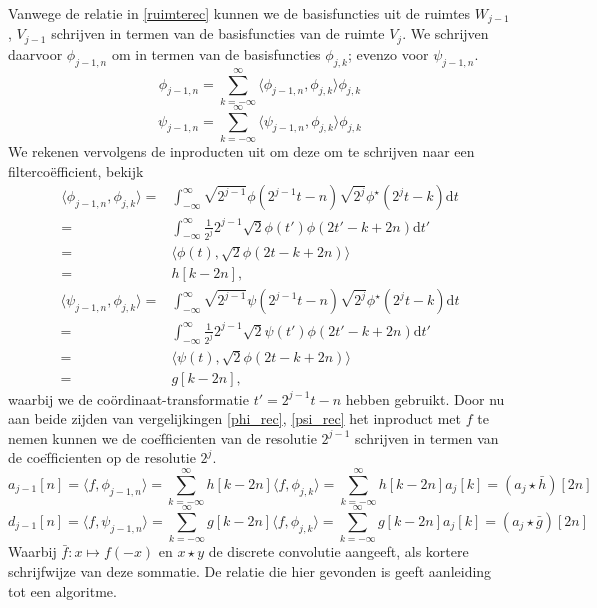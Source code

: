 \documentclass[11pt]{uvamath}
\theoremstyle{plain}
\theoremstyle{definition}
\theoremstyle{remark}
\newcommand{\eq}[1]{\begin{eqnarray*} #1 \end{eqnarray*}}
\newcommand{\inpr}[2]{\langle #1 , #2 \rangle}
\renewcommand{\d}[1]{{\mathrm{d} #1}}
\begin{document}
Vanwege de relatie in \ref{ruimterec} kunnen we de basisfuncties uit de ruimtes $W_{j-1}$,
$V_{j-1}$ schrijven in termen van de basisfuncties van de ruimte $V_j$.
We schrijven daarvoor $\phi_{j-1,n}$ om in termen van de basisfuncties $\phi_{j,k}$; evenzo
voor $\psi_{j-1,n}$.
\begin{equation}
  \label{phi_rec}
  \phi_{j-1,n} = \sum_{k=-\infty}^{\infty} \inpr{\phi_{j-1,n}}{\phi_{j,k}} \phi_{j,k}
\end{equation}
\begin{equation}
  \label{psi_rec}
  \psi_{j-1,n} = \sum_{k=-\infty}^{\infty} \inpr{\psi_{j-1,n}}{\phi_{j,k}} \phi_{j,k}
\end{equation}
We rekenen vervolgens de inproducten uit om deze om te schrijven naar een filterco\"efficient,
bekijk
\eq{
  \inpr{\phi_{j-1,n}}{\phi_{j,k}}
  =& \int_{-\infty}^\infty \sqrt{2^{j-1}}\phi(2^{j-1}t -n)
  \sqrt{2^{j}}\phi^\star(2^j t - k) \d{t}\\
  =& \int_{-\infty}^\infty \tfrac{1}{2^j} 2^{j-1}
  \sqrt{2} \phi(t') \phi(2t' - k + 2n) \d{t'}\\
  =& \inpr{\phi(t)}{\sqrt{2}\phi(2t-k+2n)} \\
  =& h[k-2n],
}
\eq{
  \inpr{\psi_{j-1,n}}{\phi_{j,k}}
  =& \int_{-\infty}^\infty \sqrt{2^{j-1}}\psi(2^{j-1}t -n)
  \sqrt{2^{j}}\phi^\star(2^j t - k) \d{t}\\
  =& \int_{-\infty}^\infty \tfrac{1}{2^j} 2^{j-1}
  \sqrt{2} \psi(t') \phi(2t' - k + 2n) \d{t'}\\
  =& \inpr{\psi(t)}{\sqrt{2}\phi(2t-k+2n)} \\
  =& g[k-2n],
}
waarbij we de co\"ordinaat-transformatie $t' = 2^{j-1}t - n$ hebben gebruikt.
Door nu aan beide zijden van vergelijkingen \ref{phi_rec}, \ref{psi_rec} het
inproduct met $f$ te nemen kunnen we de coe\"fficienten van de resolutie $2^{j-1}$ schrijven
in termen van de coe\"fficienten op de resolutie $2^j$.
\begin{equation}
  \label{approx_rec}
  a_{j-1}[n] = \inpr{f}{\phi_{j-1,n}}
  = \sum_{k=-\infty}^{\infty} h[k-2n] \inpr{f}{\phi_{j,k}}
  = \sum_{k=-\infty}^\infty h[k-2n] a_{j}[k]
  = (a_j \star \bar h)[2n]
\end{equation}
\begin{equation}
  \label{detail_rec}
  d_{j-1}[n] = \inpr{f}{\psi_{j-1,n}}
  = \sum_{k=-\infty}^{\infty} g[k-2n] \inpr{f}{\phi_{j,k}}
  = \sum_{k=-\infty}^\infty g[k-2n] a_{j}[k]
  = (a_j \star \bar g)[2n]
\end{equation}
Waarbij $\bar f: x \mapsto f(-x)$ en $x\star y$ de discrete convolutie aangeeft,
als kortere schrijfwijze van deze sommatie.
De relatie die hier gevonden is geeft aanleiding tot een algoritme.
\end{document}
